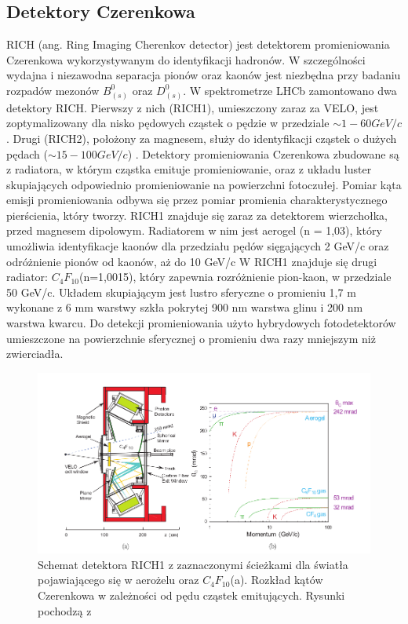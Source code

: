 \subsection{Detektory Czerenkowa}
RICH (ang. Ring Imaging Cherenkov detector) jest detektorem promieniowania Czerenkowa wykorzystywanym do identyfikacji hadronów. W szczególności wydajna i niezawodna separacja pionów oraz kaonów jest niezbędna przy badaniu rozpadów mezonów $B_{(s)}^0$ oraz $D_{(s)}^0$. W spektrometrze LHCb zamontowano dwa detektory RICH. Pierwszy z nich (RICH1), umieszczony zaraz za VELO, jest zoptymalizowany dla nisko pędowych cząstek o pędzie w przedziale $\sim 1- 60 GeV/c$. Drugi (RICH2), położony za magnesem, służy do identyfikacji cząstek o dużych pędach ($\sim 15-100 GeV/c$) \cite{RICH}. Detektory promieniowania Czerenkowa zbudowane są z radiatora, w którym cząstka emituje promieniowanie, oraz z układu luster skupiających odpowiednio promieniowanie na powierzchni fotoczułej. Pomiar kąta emisji promieniowania odbywa się przez pomiar promienia charakterystycznego pierścienia, który tworzy.
RICH1 znajduje się zaraz za detektorem wierzchołka, przed magnesem dipolowym. Radiatorem w nim jest aerogel (n = 1,03), który umożliwia identyfikacje kaonów dla przedziału pędów sięgających 2 GeV/c oraz odróżnienie pionów od kaonów, aż do 10 GeV/c  W RICH1 znajduje się drugi radiator:  $C_4F_{10}$(n=1,0015), który zapewnia rozróżnienie pion-kaon, w przedziale  50 GeV/c. Układem skupiającym jest lustro sferyczne o promieniu 1,7 m wykonane z
6 mm warstwy szkła pokrytej 900 nm warstwa glinu i 200 nm warstwa kwarcu. Do detekcji promieniowania użyto hybrydowych fotodetektorów umieszczone na powierzchnie sferycznej o promieniu dwa razy mniejszym niż zwierciadła.



\begin{figure}[th]
  \centering
  \includegraphics[scale=0.5]{rozdzial2/RICH.png}
  \caption{Schemat detektora RICH1	z zaznaczonymi ścieżkami dla światła pojawiającego się w aerożelu oraz $C_4F_{10}$(a). Rozkład kątów Czerenkowa w zależności od pędu cząstek emitujących. Rysunki pochodzą z  \cite{public}}
  \label{fig:RICH}
\end{figure}



